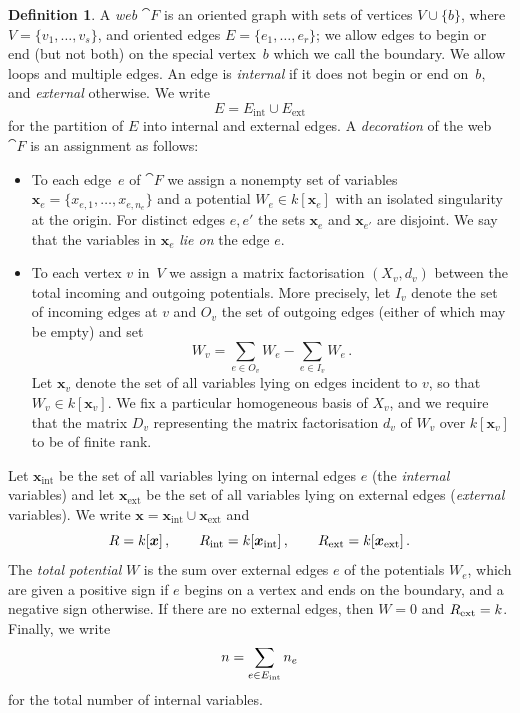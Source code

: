 \documentclass{compositio}
\theoremstyle{definition}
\newtheorem{definition}[theorem]{Definition}
\numberwithin{equation}{section}
\begin{document}
\begin{definition}\label{defwebs}
A \emph{web} $\cat{F}$ is an oriented graph with sets of vertices $V\cup \{b\}$, where $V = \{ v_1, \ldots, v_s \}$, and oriented edges $E = \{ e_1, \ldots, e_r \}$; we allow edges to begin or end (but not both) on the special vertex~$b$ which we call the boundary. We allow loops and multiple edges. An edge is \emph{internal} if it does not begin or end on~$b$, and \emph{external} otherwise. We write
\[
E = E_{\text{int}} \cup E_{\text{ext}}
\]
for the partition of $E$ into internal and external edges. A \emph{decoration} of the web $\cat{F}$ is an assignment as follows: 
\begin{itemize}
\item To each edge~$e$ of $\cat{F}$ we assign a nonempty set of variables $\boldsymbol{x}_e = \{ x_{e,1}, \ldots, x_{e,n_e} \}$ and a potential $W_e \in k[\boldsymbol{x}_e]$ with an isolated singularity at the origin. For distinct edges $e,e'$ the sets $\boldsymbol{x}_e$ and $\boldsymbol{x}_{e'}$ are disjoint. We say that the variables in $\boldsymbol{x}_e$ \emph{lie on} the edge $e$.
\item To each vertex $v$ in~$V$ we assign a matrix factorisation $(X_v,d_v)$ between the total incoming and outgoing potentials. More precisely, let $I_v$ denote the set of incoming edges at $v$ and $O_v$ the set of outgoing edges (either of which may be empty) and set
\[
W_v = \sum_{e \in O_v} W_e - \sum_{e \in I_v} W_e \, .
\]
Let $\boldsymbol{x}_v$ denote the set of all variables lying on edges incident to $v$, so that $W_v \in k[\boldsymbol{x}_v]$. We fix a particular homogeneous basis of $X_v$, and we require that the matrix $D_v$ representing the matrix factorisation $d_{v}$ of $W_v$ over $k[\boldsymbol{x}_v]$ to be of finite rank. 
\end{itemize}
Let $\boldsymbol{x}_{\text{int}}$ be the set of all variables lying on internal edges $e$ (the \emph{internal} variables) and let $\boldsymbol{x}_{\text{ext}}$ be the set of all variables lying on external edges (\emph{external} variables). We write $\boldsymbol{x} = \boldsymbol{x}_{\text{int}} \cup \boldsymbol{x}_{\text{ext}}$ and
\[
R = k[\boldsymbol{x}] \, , \qquad R_{\text{int}} = k[\boldsymbol{x}_{\text{int}}] \, , \qquad R_{\text{ext}} = k[\boldsymbol{x}_{\text{ext}}] \, .
\]
The \emph{total potential} $W$ is the sum over external edges $e$ of the potentials $W_e$, which are given a positive sign if $e$ begins on a vertex and ends on the boundary, and a negative sign otherwise. If there are no external edges, then $W = 0$ and $R_{\text{ext}} = k$. Finally, we write
\[
n = \sum_{e \in E_{\text{int}}} n_e
\]
for the total number of internal variables.
\end{definition}
\end{document}
